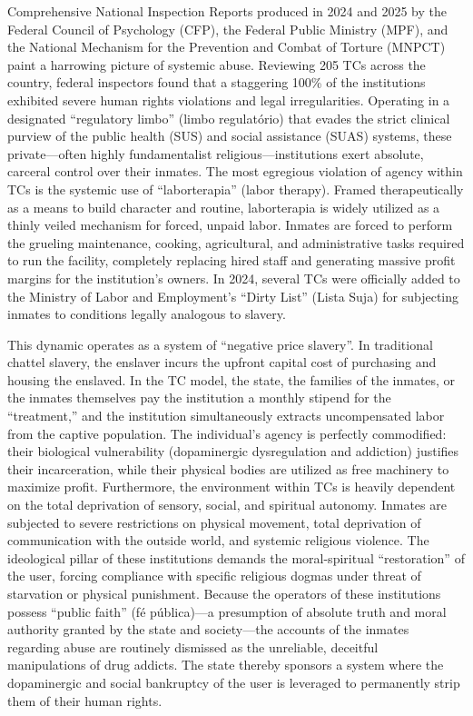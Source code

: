 Comprehensive National Inspection Reports produced in 2024 and 2025 by the Federal Council of Psychology (CFP), the Federal Public Ministry (MPF), and the National Mechanism for the Prevention and Combat of Torture (MNPCT) paint a harrowing picture of systemic abuse. Reviewing 205 TCs across the country, federal inspectors found that a staggering 100\% of the institutions exhibited severe human rights violations and legal irregularities. Operating in a designated ``regulatory limbo'' (limbo regulatório) that evades the strict clinical purview of the public health (SUS) and social assistance (SUAS) systems, these private---often highly fundamentalist religious---institutions exert absolute, carceral control over their inmates. The most egregious violation of agency within TCs is the systemic use of ``laborterapia'' (labor therapy). Framed therapeutically as a means to build character and routine, laborterapia is widely utilized as a thinly veiled mechanism for forced, unpaid labor. Inmates are forced to perform the grueling maintenance, cooking, agricultural, and administrative tasks required to run the facility, completely replacing hired staff and generating massive profit margins for the institution's owners. In 2024, several TCs were officially added to the Ministry of Labor and Employment's ``Dirty List'' (Lista Suja) for subjecting inmates to conditions legally analogous to slavery.

This dynamic operates as a system of ``negative price slavery''. In traditional chattel slavery, the enslaver incurs the upfront capital cost of purchasing and housing the enslaved. In the TC model, the state, the families of the inmates, or the inmates themselves pay the institution a monthly stipend for the ``treatment,'' and the institution simultaneously extracts uncompensated labor from the captive population. The individual's agency is perfectly commodified: their biological vulnerability (dopaminergic dysregulation and addiction) justifies their incarceration, while their physical bodies are utilized as free machinery to maximize profit. Furthermore, the environment within TCs is heavily dependent on the total deprivation of sensory, social, and spiritual autonomy. Inmates are subjected to severe restrictions on physical movement, total deprivation of communication with the outside world, and systemic religious violence. The ideological pillar of these institutions demands the moral-spiritual ``restoration'' of the user, forcing compliance with specific religious dogmas under threat of starvation or physical punishment. Because the operators of these institutions possess ``public faith'' (fé pública)---a presumption of absolute truth and moral authority granted by the state and society---the accounts of the inmates regarding abuse are routinely dismissed as the unreliable, deceitful\\
manipulations of drug addicts. The state thereby sponsors a system where the dopaminergic and social bankruptcy of the user is leveraged to permanently strip them of their human rights.

